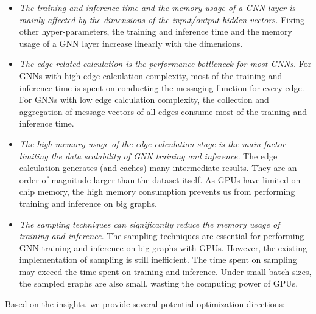 \begin{itemize}
    \item \emph{The training and inference time and the memory usage of a GNN layer is mainly affected by the dimensions of the input/output hidden vectors.}
    Fixing other hyper-parameters, the training and inference time and the memory usage of a GNN layer increase linearly with the dimensions.
    
    \item \emph{The edge-related calculation is the performance bottleneck for most GNNs.}
    For GNNs with high edge calculation complexity, most of the training and inference time is spent on conducting the messaging function for every edge.
    For GNNs with low edge calculation complexity, the collection and aggregation of message vectors of all edges consume most of the training and inference time.
    
    \item \emph{The high memory usage of the edge calculation stage is the main factor limiting the data scalability of GNN training and inference.}
    The edge calculation generates (and caches) many intermediate results.
    They are an order of magnitude larger than the dataset itself.
    As GPUs have limited on-chip memory, the high memory consumption prevents us from performing training and inference on big graphs.
    
    \item \emph{The sampling techniques can significantly reduce the memory usage of training and inference.}
    The sampling techniques are essential for performing GNN training and inference on big graphs with GPUs.
    However, the existing implementation of sampling is still inefficient.
    The time spent on sampling may exceed the time spent on training and inference.
    Under small batch sizes, the sampled graphs are also small, wasting the computing power of GPUs.
\end{itemize}

Based on the insights, we provide several potential optimization directions:

